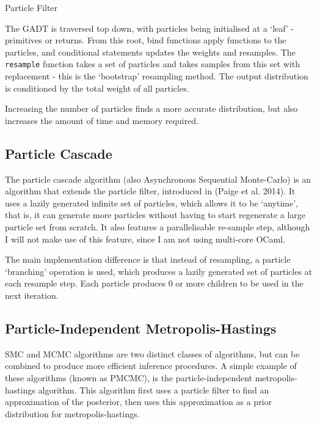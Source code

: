 \begin{listing}[!htb]
	\centering
	\caption{Particle Filter}
	\label{lst:smc}
\end{listing}

The GADT is traversed top down, with particles being initialised at a `leaf' - primitives or returns. From this root, bind functions apply functions to the particles, and conditional statements updates the weights and resamples. The \texttt{resample} function takes a set of particles and takes samples from this set with replacement - this is the `bootstrap' resampling method. The output distribution is conditioned by the total weight of all particles.

Increasing the number of particles finds a more accurate distribution, but also increases the amount of time and memory required.

\subsection{Particle Cascade} \label{sec:pc}
The particle cascade algorithm (also Asynchronous Sequential Monte-Carlo) is an algorithm that extends the particle filter, introduced in (Paige et al. 2014)\cite{paige2014asynchronous}. It uses a lazily generated infinite set of particles, which allows it to be `anytime', that is, it can generate more particles without having to start regenerate a large particle set from scratch. It also features a parallelisable re-sample step, although I will not make use of this feature, since I am not using multi-core OCaml.

The main implementation difference is that instead of resampling, a particle `branching' operation is used, which produces a lazily generated set of particles at each resample step. Each particle produces 0 or more children to be used in the next iteration.

\subsection{Particle-Independent Metropolis-Hastings} \label{sec:pimh}

SMC and MCMC algorithms are two distinct classes of algorithms, but can be combined to produce more efficient inference procedures. A simple example of these algorithms (known as PMCMC), is the particle-independent metropolis-hastings algorithm\cite{pmcmc}. This algorithm first uses a particle filter to find an approximation of the posterior, then uses this approximation as a prior distribution for metropolis-hastings.

